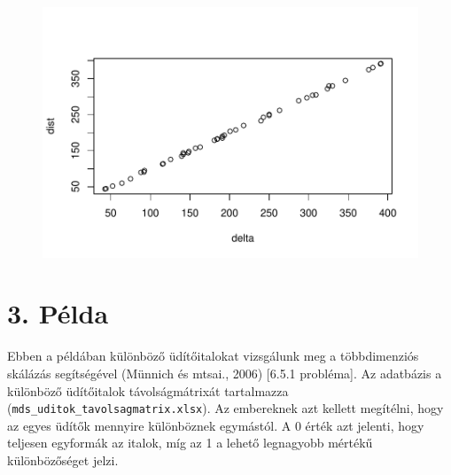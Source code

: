 \documentclass[
  letterpaper,
]{krantz}
\makeatletter
\newenvironment{Shaded}{\begin{snugshade}}{\end{snugshade}}
\newcommand{\FunctionTok}[1]{\textcolor[rgb]{0.28,0.35,0.67}{#1}}
\newcommand{\NormalTok}[1]{\textcolor[rgb]{0.00,0.23,0.31}{#1}}
\newcommand{\OtherTok}[1]{\textcolor[rgb]{0.00,0.23,0.31}{#1}}
\newcommand{\SpecialCharTok}[1]{\textcolor[rgb]{0.37,0.37,0.37}{#1}}
\newenvironment{kframe}{%
\medskip{}
\setlength{\fboxsep}{.8em}
 \def\at@end@of@kframe{}%
 \ifinner\ifhmode%
  \def\at@end@of@kframe{\end{minipage}}%
  \begin{minipage}{\columnwidth}%
 \fi\fi%
 \def\FrameCommand##1{\hskip\@totalleftmargin \hskip-\fboxsep
 \colorbox{shadecolor}{##1}\hskip-\fboxsep
     \hskip-\linewidth \hskip-\@totalleftmargin \hskip\columnwidth}%
 \MakeFramed {\advance\hsize-\width
   \@totalleftmargin\z@ \linewidth\hsize
   \@setminipage}}%
 {\par\unskip\endMakeFramed%
 \at@end@of@kframe}
\renewenvironment{Shaded}{\begin{kframe}}{\end{kframe}}
\makeatother
\begin{document}
\begin{Shaded}
\end{Shaded}

\begin{figure}[H]

{\centering \includegraphics{./sec_tobbdimenzios_skalazas_files/figure-pdf/unnamed-chunk-14-1.pdf}

}

\end{figure}

\hypertarget{puxe9lda-2}{%
\section{3. Példa}\label{puxe9lda-2}}

Ebben a példában különböző üdítőitalokat vizsgálunk meg a többdimenziós
skálázás segítségével (Münnich és mtsai., 2006) {[}6.5.1 probléma{]}. Az
adatbázis a különböző üdítőitalok távolságmátrixát tartalmazza
(\texttt{mds\_uditok\_tavolsagmatrix.xlsx}). Az embereknek azt kellett
megítélni, hogy az egyes üdítők mennyire különböznek egymástól. A 0
érték azt jelenti, hogy teljesen egyformák az italok, míg az 1 a lehető
legnagyobb mértékű különbözőséget jelzi.
\end{document}
